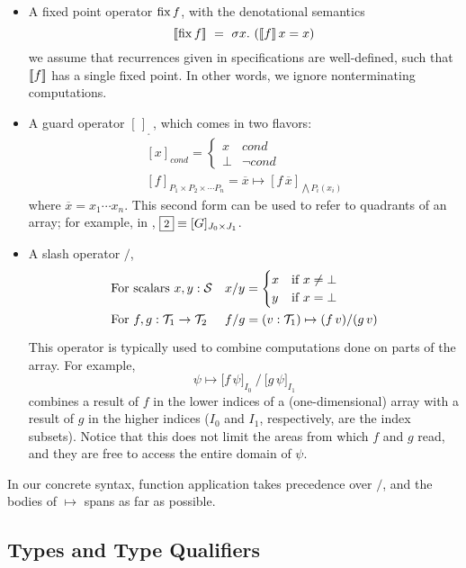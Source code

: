 \begin{itemize}
  \item A fixed point operator $\operatorname{fix} f$, with the denotational semantics
    \[[\![{\operatorname{fix} f}]\!] ~=~ \sigma x.~ ([\![{f}]\!]\,x=x)\]
  we assume that recurrences given in specifications are well-defined, 
  such that $[\![{f}]\!]$ has a single fixed point.
  In other words, we ignore nonterminating computations.
  \item A guard operator $[\,]_{_\square}\,$, which comes in two flavors:
  \[\begin{array}{l}
      [x]_{\mathit{cond}} = \begin{cases}x & \mathit{cond} \\ \bot & \lnot\mathit{cond}\end{cases} \\
      {}[f]_{P_1\times P_2\times \cdots P_n} = \overline{x} \mapsto [f\,\overline{x}]_{\bigwedge P_i(x_i)}
    \end{array}\]
  where $\overline{x} = x_1 \cdots x_n$. This second form can be used to
  refer to quadrants of an array; for example, in , $\qbox2 \equiv [G]_{J_0\times J_1}$.
  \item A slash operator $/$,     \vspace{-2pt}
  \[\renewcommand\arraystretch{1.5}
    \begin{array}{ll}
      \mbox{For scalars $x,y:\S$} & x/y = \begin{cases}x & \mbox{if }x\neq\bot \\ y & \mbox{if }x=\bot\end{cases} \\
      \mbox{For $f,g:\T_1\to\T_2$} & f/g = (v:\T_1)\mapsto (f\,v)/(g\,v)
    \end{array}\]
  This operator is typically used to combine computations done on
  parts of the array. For example, \[\psi\mapsto \big[f\,\psi\big]_{I_0} ~ \Big/ ~ \big[g\,\psi\big]_{I_1}\]
  combines a result of $f$ in the lower indices of a (one-dimensional) array
  with a result of $g$ in the higher indices ($I_0$ and $I_1$, respectively, are the index subsets).
  Notice that this does not limit the areas from which $f$ and $g$ read,
  and they are free to access the entire domain of $\psi$.
\end{itemize}

In our concrete syntax, function application takes precedence over $/$,
and the bodies of $\mapsto$ spans as far as possible.

\subsection{Types and Type Qualifiers}

